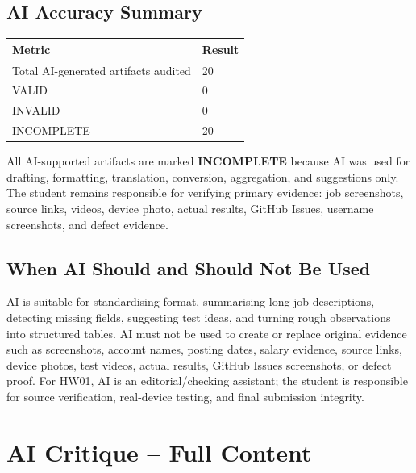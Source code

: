 \documentclass[12pt, a4paper]{article}
\newcommand{\incompl}{\textcolor{WarnOrange}{\textbf{INCOMPLETE}}}
\begin{document}
\subsection{AI Accuracy Summary}

\begin{table}[h!]
\centering
\begin{tabularx}{\textwidth}{@{} X C{4cm} @{}}
\toprule
{}
\textbf{Metric} & \textbf{Result} \\
\midrule
Total AI-generated artifacts audited & 20 \\
VALID & 0 \\
INVALID & 0 \\
INCOMPLETE & 20 \\
\bottomrule
\end{tabularx}
\end{table}

All AI-supported artifacts are marked \incompl{} because AI was used for drafting, formatting, translation, conversion, aggregation, and suggestions only. The student remains responsible for verifying primary evidence: job screenshots, source links, videos, device photo, actual results, GitHub Issues, username screenshots, and defect evidence.

\subsection{When AI Should and Should Not Be Used}

AI is suitable for standardising format, summarising long job descriptions, detecting missing fields, suggesting test ideas, and turning rough observations into structured tables. AI must not be used to create or replace original evidence such as screenshots, account names, posting dates, salary evidence, source links, device photos, test videos, actual results, GitHub Issues screenshots, or defect proof. For HW01, AI is an editorial/checking assistant; the student is responsible for source verification, real-device testing, and final submission integrity.

\section{AI Critique -- Full Content}
\end{document}
